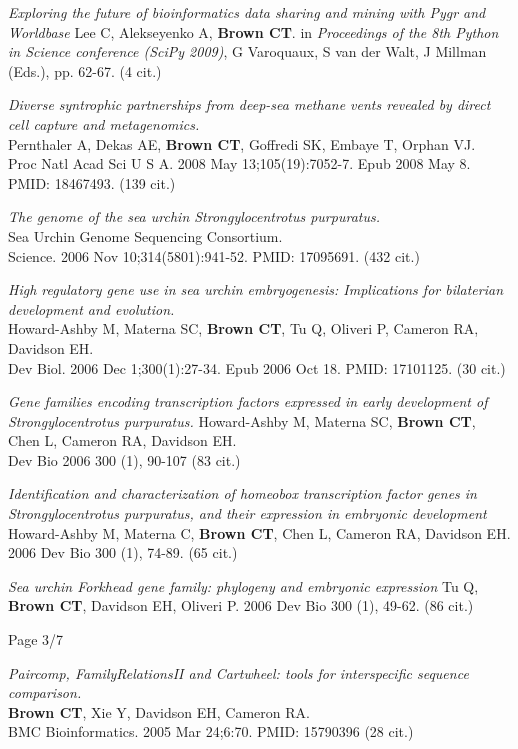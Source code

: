 \documentclass[margin,line]{resume}
\begin{document}
\begin{resume}
{\em Exploring the future of bioinformatics data sharing and mining
  with Pygr and Worldbase} Lee C, Alekseyenko A, {\bf Brown CT}.  in {\em
  Proceedings of the 8th Python in Science conference (SciPy 2009)}, G
Varoquaux, S van der Walt, J Millman (Eds.), pp. 62-67.  (4 cit.)

{\em Diverse syntrophic partnerships from deep-sea methane vents revealed by direct cell capture and metagenomics.}\\
Pernthaler A, Dekas AE, {\bf Brown CT}, Goffredi SK, Embaye T, Orphan VJ.\\
Proc Natl Acad Sci U S A. 2008 May
13;105(19):7052-7. Epub 2008 May 8.  PMID: 18467493.  (139 cit.)

{\em The genome of the sea urchin Strongylocentrotus purpuratus.}\\
Sea Urchin Genome Sequencing Consortium.\\
Science. 2006 Nov 10;314(5801):941-52.
PMID: 17095691.  (432 cit.)

{\em High regulatory gene use in sea urchin embryogenesis: Implications for bilaterian development and evolution.}\\
Howard-Ashby M, Materna SC, {\bf Brown CT}, Tu Q, Oliveri P, Cameron RA, Davidson EH.\\
Dev Biol. 2006 Dec 1;300(1):27-34. Epub 2006 Oct 18.
PMID: 17101125.  (30 cit.)

{\em Gene families encoding transcription factors expressed in early development of Strongylocentrotus purpuratus.}
Howard-Ashby M, Materna SC, {\bf Brown CT}, Chen L, Cameron RA, Davidson EH.\\
Dev Bio 2006 300 (1), 90-107 (83 cit.)

{\em Identification and characterization of homeobox transcription factor genes in Strongylocentrotus purpuratus, and their expression in embryonic development}
Howard-Ashby M, Materna C, {\bf Brown CT}, Chen L, Cameron RA, Davidson EH.
2006 Dev Bio 300 (1), 74-89.  (65 cit.)

{\em Sea urchin Forkhead gene family: phylogeny and embryonic expression}
Tu Q, {\bf Brown CT}, Davidson EH, Oliveri P.
2006 Dev Bio 300 (1), 49-62. (86 cit.)

\vspace{2cm}
{\centerline {Page 3/7}}

\newpage

{\em Paircomp, FamilyRelationsII and Cartwheel: tools for interspecific sequence comparison.}\\
{\bf Brown CT}, Xie Y, Davidson EH, Cameron RA.\\
BMC Bioinformatics. 2005 Mar 24;6:70.
PMID: 15790396 (28 cit.)


\end{resume}
\end{document}
